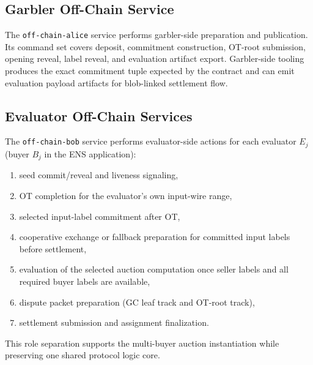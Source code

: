\documentclass[final,twoside]{vutinfth}
\begin{document}
\subsection{Garbler Off-Chain Service}
The \texttt{off-chain-alice} service performs garbler-side preparation and publication.
Its command set covers deposit, commitment construction, OT-root submission,
opening reveal, label reveal, and evaluation artifact export.
Garbler-side tooling produces the exact commitment tuple expected by the
contract and can emit evaluation payload artifacts for blob-linked settlement
flow.

\subsection{Evaluator Off-Chain Services}
The \texttt{off-chain-bob} service performs evaluator-side actions for each
evaluator $E_j$ (buyer $B_j$ in the ENS application):
\begin{enumerate}
\item seed commit/reveal and liveness signaling,
\item OT completion for the evaluator's own input-wire range,
\item selected input-label commitment after OT,
\item cooperative exchange or fallback preparation for committed input labels before settlement,
\item evaluation of the selected auction computation once seller labels and all required buyer labels are available,
\item dispute packet preparation (GC leaf track and OT-root track),
\item settlement submission and assignment finalization.
\end{enumerate}
This role separation supports the multi-buyer auction instantiation while preserving one
shared protocol logic core.
\end{document}
